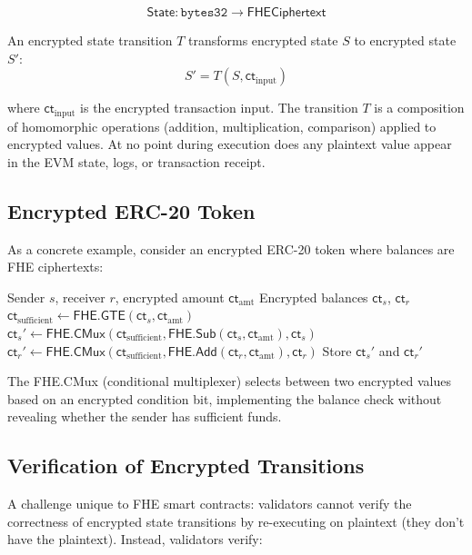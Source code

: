 \documentclass[11pt,a4paper]{article}
\begin{document}
\[
  \textsf{State}: \texttt{bytes32} \to \textsf{FHECiphertext}
\]

An encrypted state transition $T$ transforms encrypted state $S$ to encrypted
state $S'$:
\[
  S' = T(S, \textsf{ct}_{\text{input}})
\]

where $\textsf{ct}_{\text{input}}$ is the encrypted transaction input. The transition
$T$ is a composition of homomorphic operations (addition, multiplication, comparison)
applied to encrypted values. At no point during execution does any plaintext value
appear in the EVM state, logs, or transaction receipt.

\subsection{Encrypted ERC-20 Token}

As a concrete example, consider an encrypted ERC-20 token where balances are FHE
ciphertexts:

\begin{algorithm}[ht]
\caption{Encrypted ERC-20 transfer (pseudocode).}
\label{alg:encrypted-transfer}
\begin{algorithmic}[1]
\Require Sender $s$, receiver $r$, encrypted amount $\textsf{ct}_{\text{amt}}$
\Require Encrypted balances $\textsf{ct}_{s}$, $\textsf{ct}_{r}$
\State $\textsf{ct}_{\text{sufficient}} \leftarrow \textsf{FHE.GTE}(\textsf{ct}_{s}, \textsf{ct}_{\text{amt}})$ 
\State $\textsf{ct}_{s}' \leftarrow \textsf{FHE.CMux}(\textsf{ct}_{\text{sufficient}}, \textsf{FHE.Sub}(\textsf{ct}_{s}, \textsf{ct}_{\text{amt}}), \textsf{ct}_{s})$
\State $\textsf{ct}_{r}' \leftarrow \textsf{FHE.CMux}(\textsf{ct}_{\text{sufficient}}, \textsf{FHE.Add}(\textsf{ct}_{r}, \textsf{ct}_{\text{amt}}), \textsf{ct}_{r})$
\State Store $\textsf{ct}_{s}'$ and $\textsf{ct}_{r}'$
\end{algorithmic}
\end{algorithm}

The \textsf{FHE.CMux} (conditional multiplexer) selects between two encrypted values
based on an encrypted condition bit, implementing the balance check without revealing
whether the sender has sufficient funds.

\subsection{Verification of Encrypted Transitions}

A challenge unique to FHE smart contracts: validators cannot verify the correctness
of encrypted state transitions by re-executing on plaintext (they don't have the
plaintext). Instead, validators verify:
\end{document}
